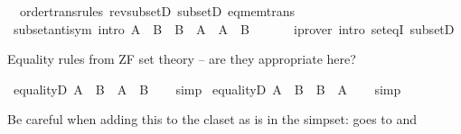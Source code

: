 \begin{isabellebody}
\ \ order{\isacharunderscore}{\kern0pt}trans{\isacharunderscore}{\kern0pt}rules\ rev{\isacharunderscore}{\kern0pt}subsetD\ subsetD\ eq{\isacharunderscore}{\kern0pt}mem{\isacharunderscore}{\kern0pt}trans%
\isadelimdocument
%
\endisadelimdocument
%
\isatagdocument
%
\isamarkuptrue%
%
\endisatagdocument
{\isafolddocument}%
%
\isadelimdocument
%
\endisadelimdocument
{}\isamarkupfalse%
\ subset{\isacharunderscore}{\kern0pt}antisym\ {\isacharbrackleft}{\kern0pt}intro{\isacharbang}{\kern0pt}{\isacharbrackright}{\kern0pt}{\isacharcolon}{\kern0pt}\ {\isachardoublequoteopen}A\ {\isasymsubseteq}\ B\ {\isasymLongrightarrow}\ B\ {\isasymsubseteq}\ A\ {\isasymLongrightarrow}\ A\ {\isacharequal}{\kern0pt}\ B{\isachardoublequoteclose}\isanewline
\ \ %
\isanewline
%
\isadelimproof
\ \ %
\endisadelimproof
%
\isatagproof
{}\isamarkupfalse%
\ {\isacharparenleft}{\kern0pt}iprover\ intro{\isacharcolon}{\kern0pt}\ set{\isacharunderscore}{\kern0pt}eqI\ subsetD{\isacharparenright}{\kern0pt}%
\endisatagproof
{\isafoldproof}%
%
\isadelimproof
%
\endisadelimproof
%
\begin{isamarkuptext}%
\medskip Equality rules from ZF set theory -- are they appropriate here?%
\end{isamarkuptext}\isamarkuptrue%
\isamarkupfalse%
\ equalityD{}{\isacharcolon}{\kern0pt}\ {\isachardoublequoteopen}A\ {\isacharequal}{\kern0pt}\ B\ {\isasymLongrightarrow}\ A\ {\isasymsubseteq}\ B{\isachardoublequoteclose}\isanewline
%
\isadelimproof
\ \ %
\endisadelimproof
%
\isatagproof
{}\isamarkupfalse%
\ simp%
\endisatagproof
{\isafoldproof}%
%
\isadelimproof
\isanewline
%
\endisadelimproof
\isanewline
{}\isamarkupfalse%
\ equalityD{}{\isacharcolon}{\kern0pt}\ {\isachardoublequoteopen}A\ {\isacharequal}{\kern0pt}\ B\ {\isasymLongrightarrow}\ B\ {\isasymsubseteq}\ A{\isachardoublequoteclose}\isanewline
%
\isadelimproof
\ \ %
\endisadelimproof
%
\isatagproof
{}\isamarkupfalse%
\ simp%
\endisatagproof
{\isafoldproof}%
%
\isadelimproof
%
\endisadelimproof
%
\begin{isamarkuptext}%
\medskip
  Be careful when adding this to the claset as  is in the
  simpset:  goes to  and 

\end{isamarkuptext}
\end{isabellebody}
